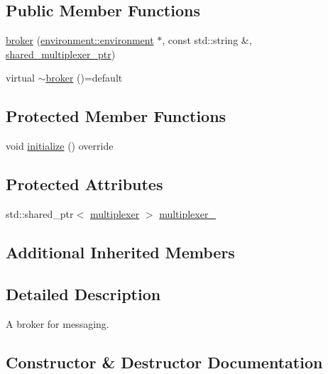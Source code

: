 \subsection*{Public Member Functions}
\begin{DoxyCompactItemize}
\item 
\hyperlink{classactor__zeta_1_1network_1_1broker_a0e9529d4114718c9b0f34078d1d2ca76}{broker} (\hyperlink{classactor__zeta_1_1environment_1_1environment}{environment\+::environment} $\ast$, const std\+::string \&, \hyperlink{namespaceactor__zeta_1_1network_a504802c43f97832081066e4c7aeb5f24}{shared\+\_\+multiplexer\+\_\+ptr})
\item 
virtual \hyperlink{classactor__zeta_1_1network_1_1broker_aaf24d2099f0c5cbee7d12bc77144f6b3}{$\sim$broker} ()=default
\end{DoxyCompactItemize}
\subsection*{Protected Member Functions}
\begin{DoxyCompactItemize}
\item 
void \hyperlink{classactor__zeta_1_1network_1_1broker_a5e63848370208ff7e670ec08ea7b3cf9}{initialize} () override
\end{DoxyCompactItemize}
\subsection*{Protected Attributes}
\begin{DoxyCompactItemize}
\item 
std\+::shared\+\_\+ptr$<$ \hyperlink{structactor__zeta_1_1network_1_1multiplexer}{multiplexer} $>$ \hyperlink{classactor__zeta_1_1network_1_1broker_aa073d9150fc257a4f39e9571f34d3686}{multiplexer\+\_\+}
\end{DoxyCompactItemize}
\subsection*{Additional Inherited Members}


\subsection{Detailed Description}
A broker for messaging. 

\subsection{Constructor \& Destructor Documentation}
\mbox{\label{classactor__zeta_1_1network_1_1broker_a0e9529d4114718c9b0f34078d1d2ca76}} 
